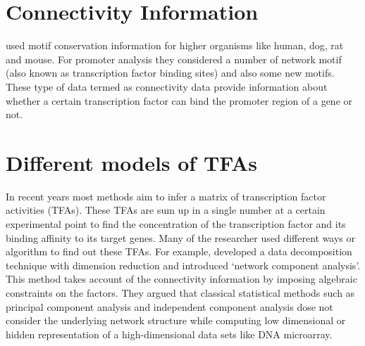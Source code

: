 \section{Connectivity Information}
\cite{Xie:2005} used motif conservation information for higher organisms like human, dog, rat 
and mouse. For promoter analysis they considered a number of network motif 
(also known as transcription factor binding sites) and also some new motifs. These type of data termed as 
connectivity data \cite{Liao:2003} provide information about whether a certain transcription factor 
can bind the promoter region of a gene or not.

\section{Different models of TFAs}
In recent years most methods aim to infer a matrix of transcription factor activities (TFAs).
These TFAs are sum up in a single number at a certain experimental point to find 
the concentration of the transcription factor and its binding affinity to its target genes. 
Many of the researcher used different ways or algorithm to find out these TFAs. 
For example, \cite{Liao:2003} developed a data decomposition technique with dimension reduction and 
introduced ‘network component analysis’. This method takes account of the connectivity information 
by imposing algebraic constraints on the factors. They argued that classical statistical methods
such as principal component analysis and independent component analysis dose not consider the underlying 
network structure while computing low dimensional or hidden representation of a high-dimensional data sets 
like DNA microarray. 


